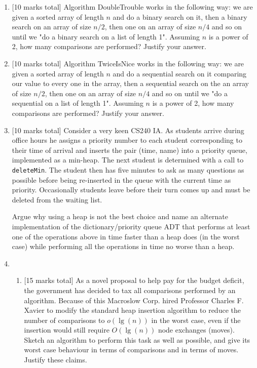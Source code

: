 \documentclass[11pt]{article}
\begin{document}
\begin{enumerate}


\item {[10 marks total]} Algorithm DoubleTrouble works in the following way: we are given a sorted array of length $n$ and do a binary search on it, then a binary search on an array of size $n/2$, then one on an array of size $n/4$ and so on until we "do a binary search on a list of length 1". Assuming $n$ is a power of 2, how many comparisons are performed? Justify your answer.
\item {[10 marks total]} Algorithm TwiceIsNice works in the following way: we are given a sorted array of length $n$ and do a sequential search on it comparing our value to every one in the array, then a sequential search on the an array of size $n/2$, then one on an array of size $n/4$ and so on until we "do a sequential on a list of length 1". Assuming $n$ is a power of 2, how many comparisons are performed? Justify your answer.

\item {[10 marks total]}
Consider a very keen CS240 IA.
As students arrive during office hours he assigns a priority number
to each student corresponding to their time of arrival and inserts the
pair (time, name) into a priority queue, implemented as a min-heap. The
next student is determined with a call to {\tt deleteMin}. The student
then has five minutes to ask as many questions as possible before being
re-inserted in the queue with the current time as priority.
Occasionally students leave before their turn comes up and must be
deleted from the waiting list.

Argue why using a heap is not the best choice and name an alternate implementation of the dictionary/priority queue ADT that performs at least one of the operations above in time faster than a heap does (in the worst case) while
performing all the operations in time no worse than a heap.

\item
\begin{enumerate}
\item {[15 marks total]} As a novel proposal to help pay for the budget deficit, the government has decided to tax all comparisons performed by an algorithm. Because of this Macroslow Corp. hired Professor Charles F. Xavier to modify the standard heap insertion algorithm to reduce the number of comparisons to $o(\lg(n))$ in the worst case, even if the insertion would still require $O(\lg(n))$ node exchanges (moves). Sketch an algorithm to perform this task as well as possible, and give its worst case behaviour in terms of comparisons and in terms of moves. Justify these claims.


\end{enumerate}
\end{enumerate}
\end{document}
